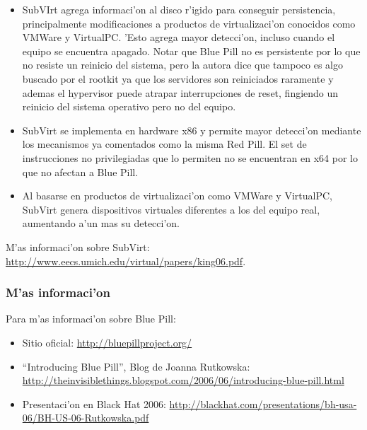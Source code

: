 \begin{itemize}

\item SubVIrt agrega informaci'on al disco r'igido para conseguir persistencia, principalmente modificaciones a productos de virtualizaci'on conocidos como VMWare y VirtualPC. 'Esto agrega mayor detecci'on, incluso cuando el equipo se encuentra apagado. Notar que Blue Pill no es persistente por lo que no resiste un reinicio del sistema, pero la autora dice que tampoco es algo buscado por el rootkit ya que los servidores son reiniciados raramente y ademas el hypervisor puede atrapar interrupciones de reset, fingiendo un reinicio del sistema operativo pero no del equipo.

\item SubVirt se implementa en hardware x86 y permite mayor detecci'on mediante los mecanismos ya comentados como la misma Red Pill. El set de instrucciones no privilegiadas que lo permiten no se encuentran en x64 por lo que no afectan a Blue Pill. 

\item Al basarse en productos de virtualizaci'on como VMWare y VirtualPC, SubVirt genera dispositivos virtuales diferentes a los del equipo real, aumentando a'un mas su detecci'on. 

\end{itemize}

M'as informaci'on sobre SubVirt: \url{http://www.eecs.umich.edu/virtual/papers/king06.pdf}.



\subsubsection{M'as informaci'on}

Para m'as informaci'on sobre Blue Pill:

\begin{itemize}

\item Sitio oficial: \url{http://bluepillproject.org/}

\item ``Introducing Blue Pill'', Blog de Joanna Rutkowska: \url{http://theinvisiblethings.blogspot.com/2006/06/introducing-blue-pill.html}

\item Presentaci'on en Black Hat 2006: \url{http://blackhat.com/presentations/bh-usa-06/BH-US-06-Rutkowska.pdf} 

\end{itemize}

